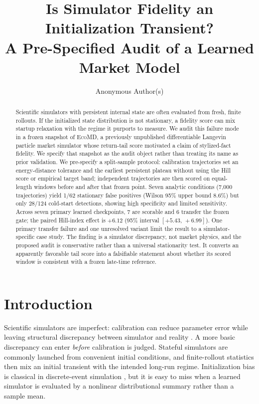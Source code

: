 \documentclass{article}
\title{Is Simulator Fidelity an Initialization Transient?\\
A Pre-Specified Audit of a Learned Market Model}
\author{Anonymous Author(s)}
\newcommand{\method}{\textsc{EcoMD}}
\newcommand{\learnedScorable}{7}
\newcommand{\learnedConfirmed}{6}
\newcommand{\learnedDelta}{\ensuremath{+6.12}}
\newcommand{\learnedCI}{\ensuremath{[+5.43,\,+6.99]}}
\begin{document}
\maketitle

\begin{abstract}
Scientific simulators with persistent internal state are often evaluated from fresh, finite rollouts.
If the initialized state distribution is not stationary, a fidelity score can mix startup relaxation
with the regime it purports to measure. We audit this failure mode in a frozen snapshot of \method,
a previously unpublished differentiable Langevin particle market simulator whose return-tail score
motivated a claim of stylized-fact fidelity. We specify that snapshot as the audit object rather than
treating its name as prior validation.
We pre-specify a
split-sample protocol: calibration trajectories set an energy-distance tolerance and the earliest
persistent plateau without using the Hill score or empirical target band; independent trajectories
are then scored on equal-length windows before and after that frozen point. Seven analytic conditions
(7,000 trajectories) yield 1/62
stationary false positives (Wilson 95\% upper bound 8.6\%) but only 28/124 cold-start detections,
showing high specificity and limited sensitivity. Across seven primary learned checkpoints,
\learnedScorable{} are scorable and \learnedConfirmed{} transfer the frozen gate; the paired Hill-index
effect is \learnedDelta{} (95\% interval \learnedCI{}). One primary transfer failure and one unresolved
variant limit the result to a simulator-specific case study. The finding is a simulator discrepancy,
not market physics, and the proposed audit is conservative rather than a universal stationarity test.
It converts an apparently favorable tail score into a falsifiable statement about whether its scored
window is consistent with a frozen late-time reference.
\end{abstract}

\section{Introduction}

Scientific simulators are imperfect: calibration can reduce parameter error while leaving structural
discrepancy between simulator and reality \citep{kennedy2001}. A more basic discrepancy can enter
\emph{before} calibration is judged. Stateful simulators are commonly launched from convenient
initial conditions, and finite-rollout statistics then mix an initial transient with the intended
long-run regime. Initialization bias is classical in discrete-event simulation
\citep{heidelberger1983,welch1983,white1997}, but it is easy to miss when a learned simulator is
evaluated by a nonlinear distributional summary rather than a sample mean.
\end{document}
